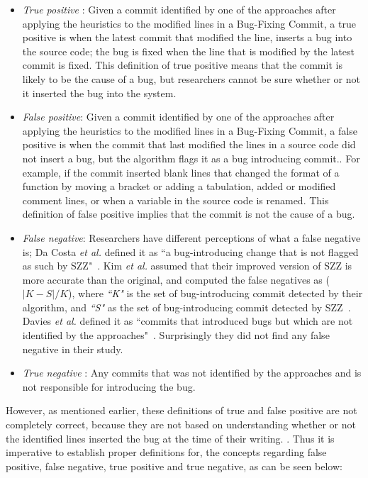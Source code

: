 \documentclass[a4paper, 12pt]{book}
\begin{document}
\begin{itemize}
  \item \emph{True positive} : Given a commit identified by one of the approaches after applying the heuristics to the modified lines in a Bug-Fixing Commit,  a true positive is when the latest commit that modified the line, inserts a bug into the source code; the bug is fixed when the line that is modified by the latest commit is fixed. This definition of true positive means that the commit is likely to be the cause of a bug, but researchers cannot be sure whether or not it inserted the bug into the system. 
  \item \emph{False positive}: Given a commit identified by one of the approaches after applying the heuristics to the modified lines in a Bug-Fixing Commit, a false positive is when the commit that last modified the lines in a source code did not insert a bug, but the algorithm flags it as a bug introducing commit.. For example, if the commit inserted blank lines that changed the format of a function by moving a bracket or adding a tabulation, added or modified comment lines, or when a variable in the source code is renamed. This definition of false positive implies that the commit is not the cause of a bug. 
  \item \emph{False negative}: Researchers have different perceptions of what a false negative is; Da Costa \emph{et al.} defined it as ``a bug-introducing change that is not flagged as such by SZZ"~\cite{da2016framework}. Kim \emph{et al.} assumed that their improved version of SZZ is more accurate than the original, and computed the false negatives as ($ |K-S|/K $), where \emph{``K"} is the set of bug-introducing commit detected by their algorithm, and \emph{``S"} as the set of bug-introducing commit detected by
SZZ~\cite{kim2006automatic}. Davies \emph{et al.} defined it as ``commits that introduced bugs but which are not identified by the approaches"~\cite{davies2014comparing}. Surprisingly they did not find any false negative in their study. 
  \item \emph{True negative} : Any commits that was not identified by the approaches and is not responsible for introducing the bug.
\end{itemize}

However, as mentioned earlier, these definitions of true and false positive are not completely correct, because they are not based on understanding whether or not the identified lines inserted the bug at the time of their writing. . Thus it is imperative to establish proper definitions for, the concepts regarding false positive, false negative, true positive and true negative, as can be seen below:
\end{document}
